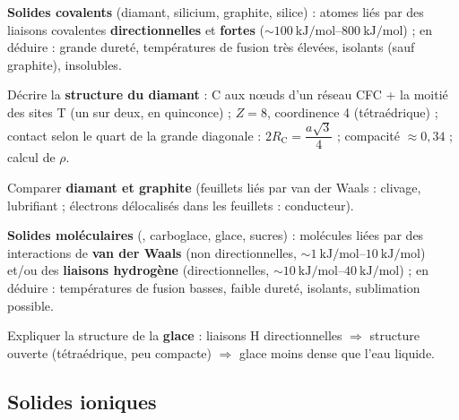 \documentclass[11pt,a4paper]{article}
\begin{document}
\begin{savoir}
  \item \textbf{Solides covalents} (diamant, silicium, graphite, silice) : atomes liés par des
        liaisons covalentes \textbf{directionnelles} et \textbf{fortes}
        ($\sim\SIrange{100}{800}{\kilo\joule\per\mol}$) ; en déduire : grande dureté,
        températures de fusion très élevées, isolants (sauf graphite), insolubles.
  \item Décrire la \textbf{structure du diamant} : C aux nœuds d'un réseau CFC + la moitié des
        sites T (un sur deux, en quinconce) ; $Z=8$, coordinence 4 (tétraédrique) ;
        contact selon le quart de la grande diagonale : $2R_{\mathrm{C}}=\dfrac{a\sqrt3}{4}$ ;
        compacité $\approx0{,}34$ ; calcul de $\rho$.
  \item Comparer \textbf{diamant et graphite} (feuillets liés par van der Waals : clivage, lubrifiant ;
        électrons délocalisés dans les feuillets : conducteur).
  \item \textbf{Solides moléculaires} (,  carboglace, glace, sucres) : molécules
        liées par des interactions de \textbf{van der Waals} (non directionnelles,
        $\sim\SIrange{1}{10}{\kilo\joule\per\mol}$) et/ou des \textbf{liaisons hydrogène}
        (directionnelles, $\sim\SIrange{10}{40}{\kilo\joule\per\mol}$) ; en déduire :
        températures de fusion basses, faible dureté, isolants, sublimation possible.
  \item Expliquer la structure de la \textbf{glace} : liaisons H directionnelles
        $\Rightarrow$ structure ouverte (tétraédrique, peu compacte) $\Rightarrow$ glace moins dense que
        l'eau liquide.
\end{savoir}

\subsection{Solides ioniques}
\end{document}
